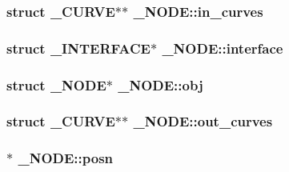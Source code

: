 \subsubsection[{\texorpdfstring{in\+\_\+curves}{in_curves}}]{\setlength{\rightskip}{0pt plus 5cm}struct {\bf \+\_\+\+C\+U\+R\+VE}$\ast$$\ast$ \+\_\+\+N\+O\+D\+E\+::in\+\_\+curves}\hypertarget{struct___n_o_d_e_a14de6723c7e5ea4058563ce88dd7f810}{}\label{struct___n_o_d_e_a14de6723c7e5ea4058563ce88dd7f810}
\subsubsection[{\texorpdfstring{interface}{interface}}]{\setlength{\rightskip}{0pt plus 5cm}struct {\bf \+\_\+\+I\+N\+T\+E\+R\+F\+A\+CE}$\ast$ \+\_\+\+N\+O\+D\+E\+::interface}\hypertarget{struct___n_o_d_e_a3d4c9b1ef9cc466dcc5a80a4001a3432}{}\label{struct___n_o_d_e_a3d4c9b1ef9cc466dcc5a80a4001a3432}
\subsubsection[{\texorpdfstring{obj}{obj}}]{\setlength{\rightskip}{0pt plus 5cm}struct {\bf \+\_\+\+N\+O\+DE}$\ast$ \+\_\+\+N\+O\+D\+E\+::obj}\hypertarget{struct___n_o_d_e_a0d0fa75880d2721a9e8b8bf2f4508598}{}\label{struct___n_o_d_e_a0d0fa75880d2721a9e8b8bf2f4508598}
\subsubsection[{\texorpdfstring{out\+\_\+curves}{out_curves}}]{\setlength{\rightskip}{0pt plus 5cm}struct {\bf \+\_\+\+C\+U\+R\+VE}$\ast$$\ast$ \+\_\+\+N\+O\+D\+E\+::out\+\_\+curves}\hypertarget{struct___n_o_d_e_a653f332f772cea48e4d98bc5c9d8866d}{}\label{struct___n_o_d_e_a653f332f772cea48e4d98bc5c9d8866d}
\subsubsection[{\texorpdfstring{posn}{posn}}]{$\ast$ \+\_\+\+N\+O\+D\+E\+::posn}\hypertarget{struct___n_o_d_e_a5cffd03bc3c33495f3b7f3a1161a7887}{}\label{struct___n_o_d_e_a5cffd03bc3c33495f3b7f3a1161a7887}
